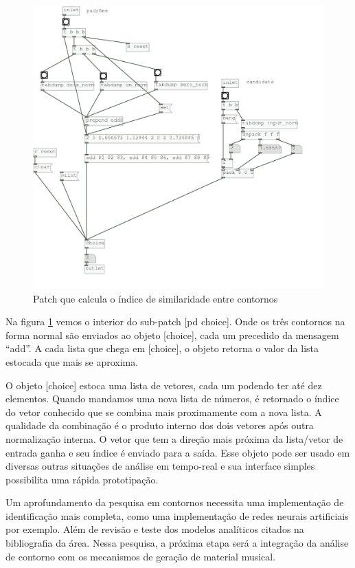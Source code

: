 \documentclass[draft]{ppgmus}
\begin{document}
\begin{figure}
\includegraphics[scale=.5]{similaridade-algo}
\caption{Patch que calcula o índice de similaridade entre contornos}
\label{similaridade-algo}
\end{figure}


Na figura \ref{similaridade-algo} vemos o interior do sub-patch [pd choice].
Onde os três contornos na forma normal são enviados ao objeto [choice], cada um
precedido da mensagem ``add''. A cada lista que chega em [choice], o objeto retorna
o valor da lista estocada que mais se aproxima.

O objeto [choice] estoca uma lista de vetores, cada um podendo ter até dez
elementos. Quando mandamos uma nova lista de números, é retornado o índice
do vetor conhecido que se combina mais proximamente com a nova lista. A qualidade
da combinação  é o produto interno dos dois vetores após outra normalização
interna. O vetor que tem a direção mais próxima da lista/vetor de entrada ganha e seu
índice é enviado para a saída. Esse objeto pode ser usado em diversas outras situações
de análise em tempo-real e sua interface simples possibilita uma rápida prototipação.

Um aprofundamento da pesquisa em contornos necessita uma implementação de identificação
mais completa, como uma implementação de redes neurais artificiais por exemplo. Além
de revisão e teste dos modelos analíticos citados na bibliografia da área.
Nessa pesquisa, a próxima etapa será a integração da análise de contorno com os
mecanismos de geração de material musical.
\end{document}
